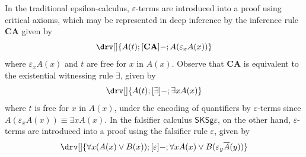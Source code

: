 \documentclass[10pt]{article}
\theoremstyle{definition}\newtheorem{remark}[theorem]{Remark}
\theoremstyle{definition}\newtheorem{example}[theorem]{Example}
\theoremstyle{definition}\newtheorem{definition}[theorem]{Definition}
\newcommand{\FalsifierCalculus}{{\mathsf{SKSg\varepsilon}}}
\newcommand{\falsifierRule}{{\mathsf{\varepsilon}}}
\begin{document}
	In the traditional epsilon-calculus, $\varepsilon$-terms are introduced into a proof using critical axioms, which may be represented in deep inference by the inference rule $\textbf{CA}$ given by
	\[
		\drv[] {
			A(t) ; [\textbf{CA}]- ; A(\varepsilon_x A(x))
		}
	\]
	where $\varepsilon_x A(x)$ and $t$ are free for $x$ in $A(x)$. Observe that $\textbf{CA}$ is equivalent to the existential witnessing rule $\exists$, given by
	\[
		\drv[] {
			A(t) ; [\exists]- ; \exists x A(x)
		}
	\]
	where $t$ is free for $x$ in $A(x)$, under the encoding of quantifiers by $\varepsilon$-terms since $A(\varepsilon_x A(x)) \equiv \exists x A(x)$. In the falsifier calculus $\FalsifierCalculus$, on the other hand, $\varepsilon$-terms are introduced into a proof using the falsifier rule $\falsifierRule$, given by
	\[
		\drv[] {
			\forall x (A(x) \lor B(x)) ; [\falsifierRule]- ; \forall x A(x) \lor B(\varepsilon_y \overline{A}(y))
		}
	\]
\end{document}
